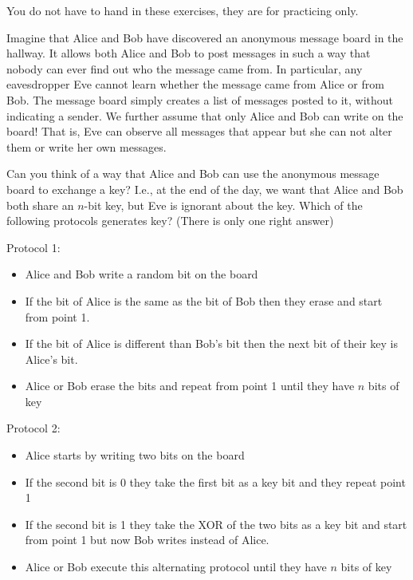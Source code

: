\documentclass[a4paper,10pt,landscape,twocolumn]{scrartcl}
\begin{document}
\practiceproblems

{\sffamily\noindent
You do not have to hand in these exercises, they are for practicing only. %
}

\begin{exercise}

Imagine that Alice and Bob have discovered an anonymous message board in the hallway. It allows both Alice and Bob to post messages in such a way that nobody can ever find out who the message came from. In particular, any eavesdropper Eve cannot learn whether the message came from Alice or from Bob. The message board simply creates a list of messages posted to it, without indicating a sender. We further assume that only Alice and Bob can write on the board! That is, Eve can observe all messages that appear but she can not alter them or write her own messages.

Can you think of a way that Alice and Bob can use the anonymous message board to exchange a key? I.e., at the end of the day, we want that Alice and Bob both share an $n$-bit key, but Eve is ignorant about the key. Which of the following protocols generates key? (There is only one right answer)

 Protocol 1:
\begin{itemize}
\setlength\itemsep{0em}
\item Alice and Bob write a random bit on the board
\item If the bit of Alice is the same as the bit of Bob then they erase and start from point 1.
\item If the bit of Alice is different than Bob's bit then the next bit of their key is Alice's bit.
\item  Alice or Bob erase the bits and repeat from point 1 until they have $n$ bits of key
\end{itemize}   
        
    Protocol 2:
    \begin{itemize}
\setlength\itemsep{0em}
\item Alice starts by writing two bits on the board
\item If the second bit is 0 they take the first bit as a key bit and they repeat point 1
\item  If the second bit is 1 they take the XOR of the two bits as a key bit and start from point 1 but now Bob writes instead of Alice.
\item   Alice or Bob execute this alternating protocol until they have $n$ bits of key
\end{itemize} 
        

\end{exercise}
\end{document}
